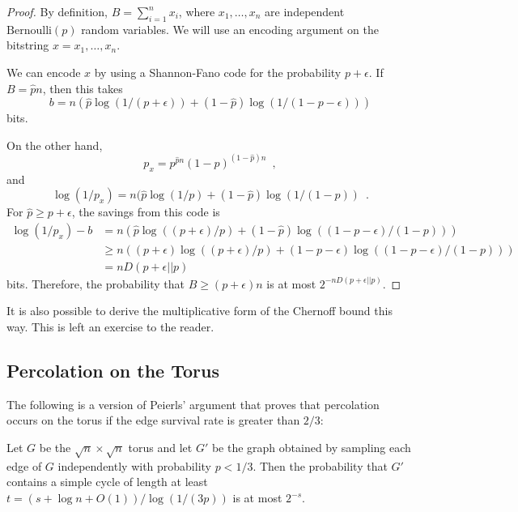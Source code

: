 \documentclass{patmorin}
\begin{document}
\begin{proof}
By definition, $B=\sum_{i=1}^nx_i$, where $x_1,\ldots,x_n$ are independent $\mathrm{Bernoulli}(p)$ random variables.   We will use an encoding argument on the bitstring $x=x_1,\ldots,x_n$.

We can encode $x$ by using a Shannon-Fano code for the probability
$p+\epsilon$.  If $B=\hat pn$, then this takes
\[
   b = n(\hat p\log(1/(p+\epsilon))+ (1-\hat p)\log(1/(1-p-\epsilon)))
\]
bits.

On the other hand,
\[
    p_x = p^{\hat pn}(1-p)^{(1-\hat p)n} \enspace ,
\]
and
\[
    \log (1/p_x) = n(\hat p\log(1/p)+ (1-\hat p)\log(1/(1-p)) \enspace .
\]
For $\hat p\ge p+\epsilon$, the savings from this code is
\begin{align*}
  \log(1/p_x) - b
    & =  n(\hat p\log((p+\epsilon)/p) + (1-\hat p)\log((1-p-\epsilon)/(1-p))) \\
    & \ge  n((p+\epsilon)\log((p+\epsilon)/p) + (1-p-\epsilon)\log((1-p-\epsilon)/(1-p)))\\
    & =  nD(p+\epsilon||p)
\end{align*}
bits.  Therefore, the probability that $B\ge (p+\epsilon)n$ is at most $2^{-nD(p+\epsilon||p)}$.
\end{proof}

It is also possible to derive the multiplicative form of the Chernoff
bound this way. This is left an exercise to the reader.

\subsection{Percolation on the Torus}

The following is a version of Peierls' argument that proves that
percolation occurs on the torus if the edge survival rate is greater
than $2/3$:

\begin{thm}
  Let $G$ be the $\sqrt n\times\sqrt n$ torus and let $G'$ be the graph
  obtained by sampling each edge of $G$ independently with probability
  $p<1/3$.  Then the probability that $G'$ contains a simple cycle of
  length at least $t=(s+\log n+O(1))/\log(1/(3p))$ is at most $2^{-s}$.
\end{thm}
\end{document}
